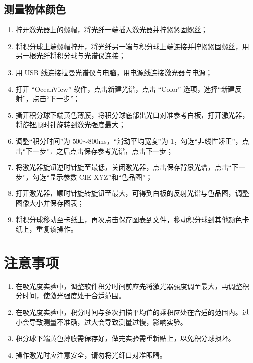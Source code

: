\subsection{测量物体颜色}
\begin{enumerate}[label=\arabic*、, leftmargin=4em, labelsep=0pt]
    \item 拧开激光器上的螺帽，将光纤一端插入激光器并拧紧紧固螺丝；
    \item 将积分球上端螺帽拧开，将光纤另一端与积分球上端连接并拧紧紧固螺丝，用另一根光纤将积分球与光谱仪连接；
    \item 用 USB 线连接拉曼光谱仪与电脑，用电源线连接激光器与电源；
    \item 打开 ``OceanView'' 软件，点击新建光谱，点击 ``Color'' 选项，选择``新建反射''，点击``下一步''；
    \item 撕开积分球下端黄色薄膜，将积分球底部出光口对准参考白板，打开激光器，将旋钮顺时针旋转到激光强度最大；
    \item 调整``积分时间''为 500$\sim$800ms，``滑动平均宽度''为 1，勾选``非线性矫正''，点击``下一步''，之后点击保存参考光谱，点击下一步；
    \item 将激光器旋钮逆时针旋至最低，关闭激光器，点击保存背景光谱，点击``下一步''，勾选``显示参数 CIE XYZ''和``色品图''；
    \item 打开激光器，顺时针旋转旋钮至最大，可得到白板的反射光谱与色品图，调整图像大小并保存图表；
    \item 将积分球移动至卡纸上，再次点击保存图表到文件，移动积分球到其他颜色卡纸上，重复该操作。
\end{enumerate}

\section{注意事项}

\begin{enumerate}[label=\arabic*、, leftmargin=4em, labelsep=0pt]
    \item 在吸光度实验中，调整软件积分时间前应先将激光器强度调至最大，再调整积分时间，使激光强度处于合适范围。
    \item 在吸光度实验中，积分时间与多次扫描平均值的乘积应处在合适的范围内。过小会导致测量不准确，过大会导致测量过慢，影响实验。
    \item 积分球下端黄色薄膜需保存好，做完实验需重新贴上，以免积分球损坏。
    \item 操作激光时应注意安全，请勿将光纤口对准眼睛。
\end{enumerate}

